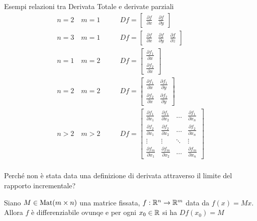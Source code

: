 \begin{example}
	Esempi relazioni tra Derivata Totale e derivate parziali
	\begin{align*}
		n = 2 \quad m = 1 \qquad & Df =
		\begin{bmatrix}
			\frac{\partial f}{\partial x} & \frac{\partial f}{\partial y}
		\end{bmatrix}\\
		n = 3 \quad m = 1 \qquad & Df =
		\begin{bmatrix}
			\frac{\partial f}{\partial x} & \frac{\partial f}{\partial y} &  \frac{\partial f}{\partial z}
		\end{bmatrix}\\
		n = 1 \quad m = 2 \qquad & Df =
		\begin{bmatrix}
			\frac{\partial f_1}{\partial x}\\[1ex]
			\frac{\partial f_2}{\partial x}
		\end{bmatrix}\\
		n = 2 \quad m = 2 \qquad & Df =
		\begin{bmatrix}
			\frac{\partial f_1}{\partial x} & \frac{\partial f_1}{\partial y}\\[1ex]
			\frac{\partial f_2}{\partial x} & \frac{\partial f_2}{\partial y}
		\end{bmatrix}\\
		n > 2 \quad m > 2 \qquad & Df =
		\begin{bmatrix}
			\frac{\partial f_1}{\partial x_1} & \frac{\partial f_1}{\partial x_2} & \dots & \frac{\partial f_1}{\partial x_n}\\[1ex]
			\frac{\partial f_2}{\partial x_1} & \frac{\partial f_2}{\partial x_2} & \dots & \frac{\partial f_2}{\partial x_n}\\[1ex]
			\vdots & \vdots & \ddots & \vdots\\[1ex]
			\frac{\partial f_m}{\partial x_1} & \frac{\partial f_m}{\partial x_2} & \dots & \frac{\partial f_m}{\partial x_n}
		\end{bmatrix}\\
	\end{align*}
\end{example}
\begin{exercise}
	Perché non è stata data una definizione di derivata attraverso il limite del rapporto incrementale?
\end{exercise}
\begin{example}
	Siano $M \in \operatorname{Mat}(m \times n)$ una matrice fissata, $f: \mathbb{R}^n \to \mathbb{R}^m$ data da $f(x) = Mx$.\\
	Allora $f$ è differenziabile ovunqe e per ogni $x_0 \in \mathbb{R}$ si ha $Df(x_0) = M$
\end{example}

